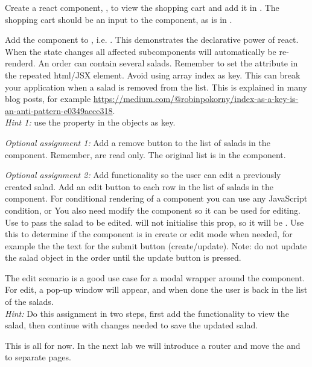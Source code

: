 \documentclass[fleqn, article, a4paper]{memoir}
\begin{document}
\begin{Assignments}
\item Create a react component, , to view the shopping cart and add it in . The shopping cart should be an input to the component, as  is in .

\item Add the  component to , i.e. . This demonstrates the declarative power of react. When the state changes all affected subcomponents will automatically be re-renderd.
\newline
\newline
An order can contain several salads. Remember to set the  attribute in the repeated html/JSX element. Avoid using array index as key. This can break your application when a salad is removed from the list. This is explained in many blog posts, for example \url{https://medium.com/@robinpokorny/index-as-a-key-is-an-anti-pattern-e0349aece318}.
\\ \noindent \emph{Hint 1:} use the  property in the  objects as key.

\item \emph{Optional assignment 1:} Add a remove button to the list of salads in the  component. Remember,  are read only. The original list is in the  component.

\item \emph{Optional assignment 2:}  Add functionality so the user can edit a previously created salad. Add an edit button to each row in the list of salads in the  component. For conditional rendering of a component you can use any JavaScript condition,  or You also need modify the  component so it can be used for editing. Use  to pass the salad to be edited.  will not initialise this prop, so it will be . Use this to determine if the  component is in create or edit mode when needed, for example the the text for the submit button (create/update). Note: do not update the salad object in the order until the update button is pressed.

The edit scenario is a good use case for a modal wrapper around the  component. For edit, a pop-up window will appear, and when done the user is back in the list of the salads.
\\ \emph{Hint: } Do this assignment in two steps, first add the functionality to view the salad, then continue with changes needed to save the updated salad.

\item This is all for now. In the next lab we will introduce a router and move the  and  to separate pages.

\end{Assignments}


\end{document}
